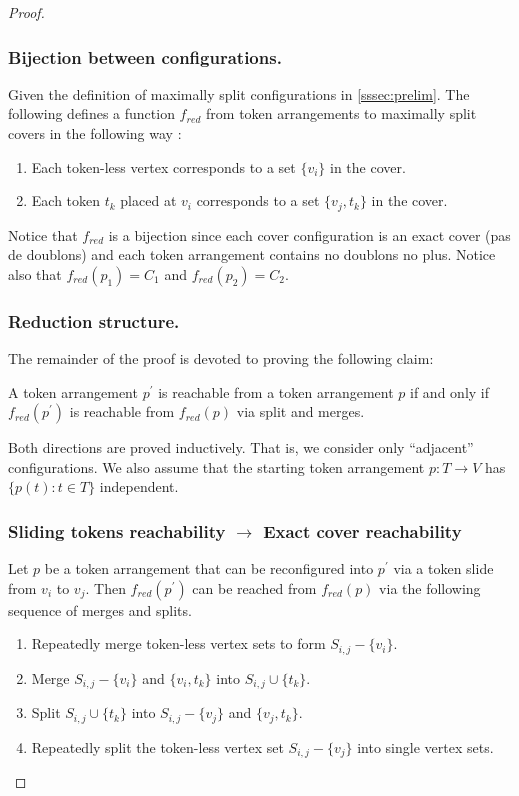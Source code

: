 \begin{proof}
\subsubsection{Bijection between configurations.}
Given the definition of maximally split configurations in \ref{sssec:prelim}. The following defines a function $f_{red}$ from token arrangements
to maximally split covers in the following way :
\begin{enumerate}
  \item Each token-less vertex corresponds to a set $\{v_i\}$ in the cover.
  \item Each token $t_k$ placed at $v_i$ corresponds to a set $\{v_j, t_k\}$ in the cover.
\end{enumerate}
Notice that $f_{red}$ is a bijection since each cover configuration is an exact cover (pas de doublons) and each token
arrangement contains no doublons no plus. Notice also that $f_{red}(p_1) = C_1$ and $f_{red}(p_2) = C_2$.

\subsubsection{Reduction structure.}
The remainder of the proof is devoted to proving the following claim:
\begin{claim} A token arrangement $p^{'}$ is reachable from a token arrangement $p$ if and only if $f_{red}(p^{'})$ is reachable from
$f_{red}(p)$ via split and merges.
\end{claim}
Both directions are proved inductively. That is, we consider only “adjacent” configurations. We also assume that the starting token
arrangement $p : T \rightarrow V$ has $ \{p(t) : t \in T \}$ independent.

\subsubsection{Sliding tokens reachability  $\rightarrow$ Exact cover reachability}
Let $p$ be a token arrangement that can be reconfigured into $p^{'}$ via a token slide from $v_i$ to $v_j$. Then $f_{red}(p^{'})$ can be reached
from $f_{red}(p)$ via the following sequence of merges and splits.
\begin{enumerate}
  \item Repeatedly merge token-less vertex sets to form $S_{i,j}-\{v_i\}$.
  \item Merge $S_{i,j} - \{v_i\}$ and $\{v_i, t_k\}$ into $S_{i,j} \cup \{t_k\}$.
  \item Split $S_{i,j} \cup \{t_k\}$ into $S_{i,j} - \{v_j\}$ and $\{v_j, t_k\}$.
  \item Repeatedly split the token-less vertex set $S_{i,j}-\{v_j\}$ into single vertex sets.
\end{enumerate}


\end{proof}
